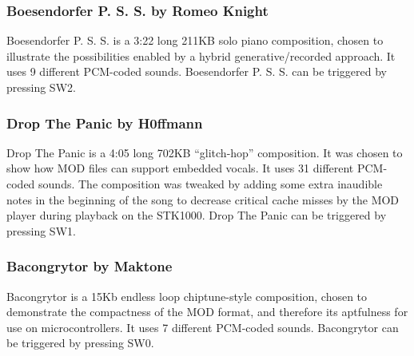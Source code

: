 \subsubsection{Boesendorfer P. S. S. by Romeo Knight}
Boesendorfer P. S. S. is a 3:22 long 211KB solo piano composition, chosen to illustrate the possibilities enabled by a hybrid generative/recorded approach.
It uses 9 different PCM-coded sounds.
Boesendorfer P. S. S. can be triggered by pressing SW2.

\subsubsection{Drop The Panic by H0ffmann}
Drop The Panic is a 4:05 long 702KB ``glitch-hop'' composition.
It was chosen to show how MOD files can support embedded vocals.
It uses 31 different PCM-coded sounds.
The composition was tweaked by adding some extra inaudible notes in the beginning of the song to decrease critical cache misses by the MOD player during playback on the STK1000.
Drop The Panic can be triggered by pressing SW1.

\subsubsection{Bacongrytor by Maktone}
Bacongrytor is a 15Kb endless loop chiptune-style composition, chosen to demonstrate the compactness of the MOD format, and therefore its aptfulness for use on microcontrollers.
It uses 7 different PCM-coded sounds.
Bacongrytor can be triggered by pressing SW0.
